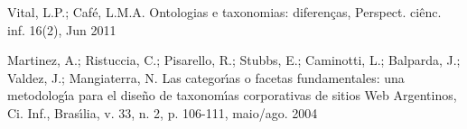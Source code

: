 \documentclass[
12pt,		%
openright,	%
twoside,  %
a4paper,			%
chapter=TITLE,		%
english,			%
french,				%
spanish,			%
brazil				%
]{USPSC-classe/USPSC}
\begin{document}
\begin{flushleft}
\begin{flushleft}
\begin{flushleft}
\begin{flushleft}
\begin{flushleft}
\begin{flushleft}
\begin{flushleft}
\begin{flushleft}
\begin{flushleft}
 Vital, L.P.; Caf\'e, L.M.A. Ontologias e taxonomias: diferen\c{c}as, Perspect. ci\^enc. inf. 16(2), Jun 2011
\end{flushleft}


\end{flushleft}


\end{flushleft}


\end{flushleft}


\end{flushleft}


\end{flushleft}


\end{flushleft}


\end{flushleft}


\end{flushleft}


\begin{flushleft}
\begin{flushleft}
\begin{flushleft}
\begin{flushleft}
\begin{flushleft}
\begin{flushleft}
\begin{flushleft}
\begin{flushleft}
\begin{flushleft}
[MARTINEZ et al., 2004] Martinez, A.; Ristuccia, C.; Pisarello, R.; Stubbs, E.; Caminotti, L.; Balparda, J.; Valdez, J.; Mangiaterra, N. Las categor\'{\i}as o facetas fundamentales: una metodolog\'{\i}a para el diseño de taxonom\'{\i}as corporativas de sitios Web Argentinos, Ci. Inf., Bras\'{\i}lia, v. 33, n. 2, p. 106-111, maio/ago. 2004
\end{flushleft}


\end{flushleft}


\end{flushleft}


\end{flushleft}


\end{flushleft}


\end{flushleft}


\end{flushleft}


\end{flushleft}


\end{flushleft}
\end{document}
